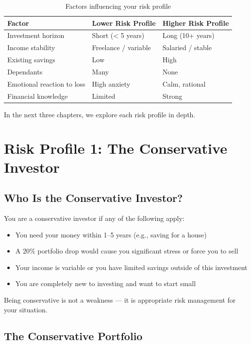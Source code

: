 \documentclass[12pt, a4paper]{book}
\begin{document}
\begin{table}[h!]
\centering
\begin{tabular}{lll}
\toprule
\textbf{Factor} & \textbf{Lower Risk Profile} & \textbf{Higher Risk Profile} \\
\midrule
Investment horizon & Short (< 5 years) & Long (10+ years) \\
Income stability & Freelance / variable & Salaried / stable \\
Existing savings & Low & High \\
Dependants & Many & None \\
Emotional reaction to loss & High anxiety & Calm, rational \\
Financial knowledge & Limited & Strong \\
\bottomrule
\end{tabular}
\caption{Factors influencing your risk profile}
\end{table}

In the next three chapters, we explore each risk profile in depth.

\chapter{Risk Profile 1: The Conservative Investor}

\section{Who Is the Conservative Investor?}

You are a conservative investor if any of the following apply:
\begin{itemize}[leftmargin=1.5cm]
  \item You need your money within 1--5 years (e.g., saving for a house)
  \item A 20\% portfolio drop would cause you significant stress or force you to sell
  \item Your income is variable or you have limited savings outside of this investment
  \item You are completely new to investing and want to start small
\end{itemize}

Being conservative is not a weakness --- it is appropriate risk management for your situation.

\section{The Conservative Portfolio}
\end{document}
